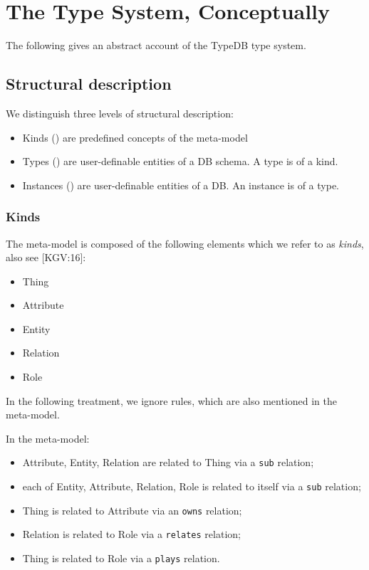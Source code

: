 \documentclass{article}
\begin{document}
\section{The Type System, Conceptually}\label{sec:type_system_conceptually}

The following gives an abstract account of the TypeDB type system.

\subsection{Structural description}

We distinguish three levels of structural description:
\begin{itemize}
\item Kinds () are predefined concepts of the meta-model
\item Types () are user-definable entities of a DB
  schema. A type is of a kind.
\item Instances () are user-definable entities
  of a DB. An instance is of a type.
\end{itemize}

\subsubsection{Kinds}\label{sec:structure_kinds}

The meta-model is composed of the following elements which we refer to as
\emph{kinds}, also see [KGV:16]:
\begin{itemize}
\item Thing
\item Attribute
\item Entity
\item Relation
\item Role
\end{itemize}
In the following treatment, we ignore rules, which are also mentioned in the
meta-model.

In the meta-model:
\begin{itemize}
\item Attribute, Entity, Relation are related to Thing via a \texttt{sub}
  relation;
\item each of Entity, Attribute, Relation, Role is related to itself via a
  \texttt{sub} relation;
\item Thing is related to Attribute via an \texttt{owns} relation;
\item Relation is related to Role via a \texttt{relates} relation;
\item Thing is related to Role via a \texttt{plays} relation.
\end{itemize}
\end{document}
